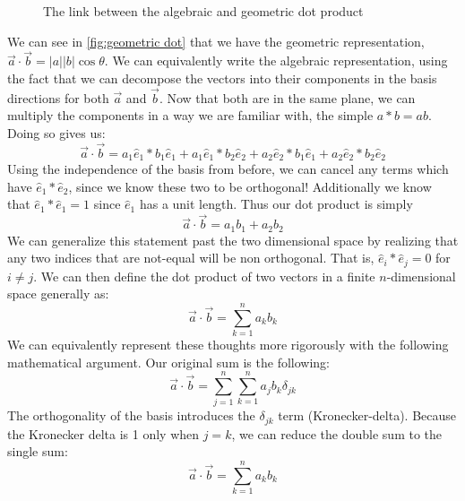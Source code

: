 \begin{figure}[ht]


    \caption{The link between the algebraic and geometric dot product}
    \label{fig:geometric dot}
\end{figure}
We can see in \autoref{fig:geometric dot} that we have the geometric representation, $\vec{a}\cdot\vec{b}=|a||b|\cos\theta$. We can equivalently write the algebraic representation, using the fact that we can decompose the vectors into their components in the basis directions for both $\vec{a}$ and $\vec{b}$. Now that both are in the same plane, we can multiply the components in a way we are familiar with, the simple $a*b=ab$. Doing so gives us:
$$\vec{a}\cdot\vec{b}=a_1\hat{e}_1*b_1\hat{e}_1+a_1\hat{e}_1*b_2\hat{e}_2+a_2\hat{e}_2*b_1\hat{e}_1+a_2\hat{e}_2*b_2\hat{e}_2$$
Using the independence of the basis from before, we can cancel any terms which have $\hat{e}_1*\hat{e}_2$, since we know these two to be orthogonal! Additionally we know that $\hat{e}_1*\hat{e}_1=1$ since $\hat{e}_1$ has a unit length. Thus our dot product is simply 
$$\vec{a}\cdot\vec{b}=a_1b_1+a_2b_2$$
We can generalize this statement past the two dimensional space by realizing that any two indices that are not-equal will be non orthogonal. That is, $\hat{e}_i*\hat{e}_j=0$ for $i\neq j$. We can then define the dot product of two vectors in a finite $n$-dimensional space generally as:
$$\vec{a}\cdot \vec{b}=\sum_{k=1}^{n}{a_kb_k}$$
We can equivalently represent these thoughts more rigorously with the following mathematical argument. Our original sum is the following:
$$\vec{a}\cdot \vec{b}=\sum_{j=1}^n\sum_{k=1}^{n}{a_jb_k}\delta_{jk}$$
The orthogonality of the basis introduces the $\delta_{jk}$ term (Kronecker-delta). Because the Kronecker delta is 1 only when $j=k$, we can reduce the double sum to the single sum:
$$\vec{a}\cdot \vec{b}=\sum_{k=1}^{n}{a_kb_k}$$

